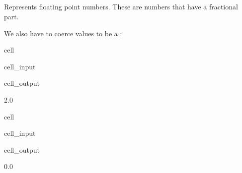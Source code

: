 \documentclass[letterpaper,10pt,english]{jupyterBook}
\begin{document}
\subsection{}
\label{\detokenize{datatypes:float}}
\sphinxAtStartPar
Represents floating point numbers.
These are numbers that have a fractional part.

\sphinxAtStartPar
We also have  to coerce values to be a :

\begin{sphinxuseclass}{cell}\begin{sphinxVerbatimInput}

\begin{sphinxuseclass}{cell_input}
\begin{sphinxVerbatim}[commandchars=\\\{\}]
\end{sphinxVerbatim}

\end{sphinxuseclass}\end{sphinxVerbatimInput}
\begin{sphinxVerbatimOutput}

\begin{sphinxuseclass}{cell_output}
\begin{sphinxVerbatim}[commandchars=\\\{\}]
2.0
\end{sphinxVerbatim}

\end{sphinxuseclass}\end{sphinxVerbatimOutput}

\end{sphinxuseclass}
\begin{sphinxuseclass}{cell}\begin{sphinxVerbatimInput}

\begin{sphinxuseclass}{cell_input}
\begin{sphinxVerbatim}[commandchars=\\\{\}]
\end{sphinxVerbatim}

\end{sphinxuseclass}\end{sphinxVerbatimInput}
\begin{sphinxVerbatimOutput}

\begin{sphinxuseclass}{cell_output}
\begin{sphinxVerbatim}[commandchars=\\\{\}]
0.0
\end{sphinxVerbatim}

\end{sphinxuseclass}\end{sphinxVerbatimOutput}

\end{sphinxuseclass}
\end{document}
